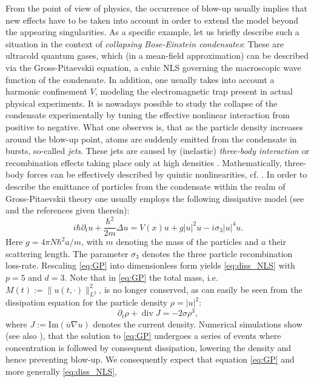 \documentclass[a4paper,leqno]{amsart}
\theoremstyle{plain}
\theoremstyle{definition}
\numberwithin{equation}{section}
\begin{document}
From the point of view of physics, the occurrence of blow-up usually implies that new effects have to be taken into account in order to extend the model beyond 
the appearing singularities. As a specific
example, let us briefly describe such a situation in the context of \emph{collapsing Bose-Einstein condensates}: 
These are ultracold quantum gases, which (in a mean-field approximation) can be described
via the Gross-Pitaevskii equation, a cubic NLS governing the macroscopic wave function of the condensate.
In addition, one usually takes into account a harmonic confinement $V$, modeling
the electromagnetic trap present in actual physical experiments. It is nowadays possible to study 
the collapse of the condensate experimentally by tuning the effective nonlinear interaction from positive to negative. 
What one observes is, that as the particle density
increases around the blow-up point, atoms are suddenly emitted from the condensate in bursts, so-called \emph{jets}. 
These jets are caused by (inelastic) \emph{three-body interaction} or recombination effects taking place only at high densities \cite{A}.
Mathematically, three-body forces can be effectively described by quintic nonlinearities, cf. \cite{CP}. 
In order to describe the emittance of particles from the condensate within the realm of Gross-Pitaevskii theory one usually employs the following dissipative model (see \cite{A, KMS, SU} and the references given therein):
\begin{equation}\label{eq:GP}
i \hbar {\partial}_t u + \frac{\hbar^2}{2m} \Delta u = V(x) u + g  |u |^2 u - i  \sigma_3   | u |^{4}u .
\end{equation}
Here $g = 4\pi N \hbar^2  a /m $, with $m$ denoting the mass of the particles and $a$ their scattering length. The 
parameter $\sigma_3$ denotes the three particle recombination loss-rate. Rescaling \eqref{eq:GP} into dimensionless form 
yields \eqref{eq:diss_NLS} with $p=5$ and $d=3$. Note that in \eqref{eq:GP} the total mass, i.e. $M(t):= \| u(t, \cdot) \|^2_{L^2}$, is no longer conserved, 
as can easily be seen from the dissipation equation for the particle density $\rho= |u|^2$:
\begin{equation}\label{eq:diss_rho}
{\partial}_t\rho+\operatorname{div} J=-2\sigma\rho^{3},
\end{equation}
where $J:={\mathrm{Im}}({\overline{{u}}}\nabla u)$ denotes the current density. Numerical simulations show \cite{BJM} (see also \cite{BJ}),
that the solution to \eqref{eq:GP} undergoes a series of events where concentration is
followed by consequent dissipation, lowering the density and hence preventing blow-up. We consequently expect that equation \eqref{eq:GP} and more generally \eqref{eq:diss_NLS},
\end{document}
